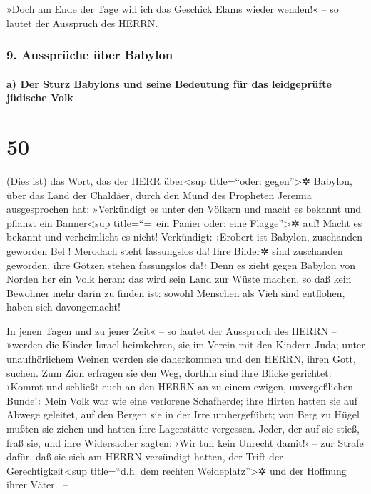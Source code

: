 »Doch am Ende der Tage will ich das Geschick Elams wieder
wenden!« -- so lautet der Ausspruch des HERRN.

\hypertarget{ausspruxfcche-uxfcber-babylon}{%
\subsubsection{9. Aussprüche über
Babylon}\label{ausspruxfcche-uxfcber-babylon}}

\hypertarget{a-der-sturz-babylons-und-seine-bedeutung-fuxfcr-das-leidgepruxfcfte-juxfcdische-volk}{%
\paragraph{a) Der Sturz Babylons und seine Bedeutung für das
leidgeprüfte jüdische
Volk}\label{a-der-sturz-babylons-und-seine-bedeutung-fuxfcr-das-leidgepruxfcfte-juxfcdische-volk}}

\hypertarget{section-49}{%
\section{50}\label{section-49}}

(Dies ist) das Wort, das der HERR über\textless sup
title=``oder: gegen''\textgreater✲ Babylon, über das Land der Chaldäer,
durch den Mund des Propheten Jeremia ausgesprochen hat:
»Verkündigt es unter den Völkern und macht es bekannt und
pflanzt ein Banner\textless sup title=``=~ein Panier oder: eine
Flagge''\textgreater✲ auf! Macht es bekannt und verheimlicht es nicht!
Verkündigt: ›Erobert ist Babylon, zuschanden geworden Bel ! Merodach
steht fassungslos da! Ihre Bilder✲ sind zuschanden geworden, ihre Götzen
stehen fassungslos da!‹ Denn es zieht gegen Babylon von
Norden her ein Volk heran: das wird sein Land zur Wüste machen, so daß
kein Bewohner mehr darin zu finden ist: sowohl Menschen als Vieh sind
entflohen, haben sich davongemacht!~--

In jenen Tagen und zu jener Zeit« -- so lautet der
Ausspruch des HERRN -- »werden die Kinder Israel heimkehren, sie im
Verein mit den Kindern Juda; unter unaufhörlichem Weinen werden sie
daherkommen und den HERRN, ihren Gott, suchen. Zum Zion
erfragen sie den Weg, dorthin sind ihre Blicke gerichtet: ›Kommt und
schließt euch an den HERRN an zu einem ewigen, unvergeßlichen Bunde!‹
Mein Volk war wie eine verlorene Schafherde; ihre Hirten
hatten sie auf Abwege geleitet, auf den Bergen sie in der Irre
umhergeführt; von Berg zu Hügel mußten sie ziehen und hatten ihre
Lagerstätte vergessen. Jeder, der auf sie stieß, fraß sie,
und ihre Widersacher sagten: ›Wir tun kein Unrecht damit!‹ -- zur Strafe
dafür, daß sie sich am HERRN versündigt hatten, der Trift der
Gerechtigkeit\textless sup title=``d.h. dem rechten
Weideplatz''\textgreater✲ und der Hoffnung ihrer Väter.~--

